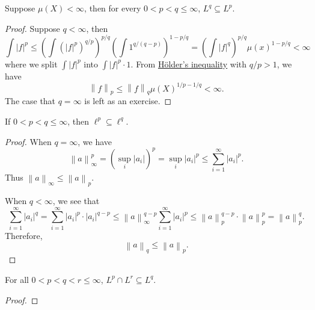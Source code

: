 \begin{proposition}
	Suppose \(\mu (X)<\infty \), then for every \(0<p<q\leq \infty \), \(L^q\subseteq L^p\).
\end{proposition}
\begin{proof}
	Suppose \(q<\infty \), then
	\[
		\int \left\vert f \right\vert ^p \leq \left(\int \left(\left\vert f \right\vert ^p\right)^{q / p}\right)^{p / q}\left(\int 1^{q/(q-p)}\right)^{1 - p / q}
		= \left(\int \left\vert f \right\vert ^q\right)^{p / q}\mu (x)^{1 - p / q}< \infty
	\]
	where we split \(\int \left\vert f \right\vert ^p\) into \(\int \left\vert f \right\vert ^p\cdot 1\). From \hyperref[thm:Holder-inequality]{Hölder's inequality}
	with \(q / p > 1\), we have
	\[
		\left\lVert f\right\rVert _p \leq \left\lVert f\right\rVert _q \mu (X)^{1 / p - 1 / q}< \infty .
	\]
	The case that \(q = \infty \) is left as an exercise.
\end{proof}

\begin{proposition}
	If \(0<p<q\leq \infty \), then \(\ell ^p\subseteq \ell ^q\).
\end{proposition}
\begin{proof}
	When \(q = \infty \), we have
	\[
		\left\lVert a\right\rVert ^p_\infty = \left(\sup _i \left\vert a_{i}  \right\vert \right)^p = \sup _i \left\vert a_{i}  \right\vert ^p \leq \sum\limits_{i=1}^{\infty} \left\vert a_{i}  \right\vert ^p.
	\]
	Thus \(\left\lVert a\right\rVert _\infty \leq \left\lVert a\right\rVert _p\).

	When \(q<\infty \), we see that
	\[
		\sum\limits_{i=1}^{\infty}\left\vert a_{i}  \right\vert  ^q
		= \sum\limits_{i=1}^{\infty} \left\vert a_{i}  \right\vert ^p \cdot \left\vert a_{i}  \right\vert ^{q - p}
		\leq \left\lVert a\right\rVert _\infty ^{q-p}\sum\limits_{i=1}^{\infty} \left\vert a_{i}  \right\vert ^p
		\leq \left\lVert a\right\rVert _p^{q-p} \cdot \left\lVert a\right\rVert _p^p = \left\lVert a\right\rVert ^q_p.
	\]
	Therefore,
	\[
		\left\lVert a\right\rVert _q\leq \left\lVert a\right\rVert _p.
	\]
\end{proof}

\begin{proposition}
	For all \(0<p<q<r\leq \infty \), \(L^p \cap L^{r} \subseteq L^q \).
\end{proposition}
\begin{proof}
\end{proof}

